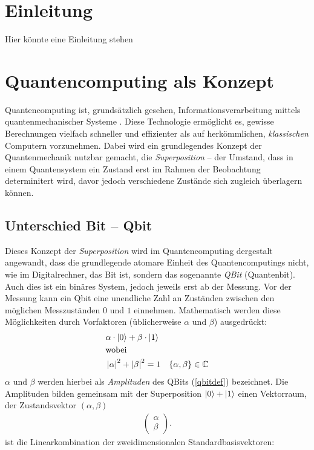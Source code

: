 \renewcommand*{\arraystretch}{1.0} %

\chapter{Einleitung}
Hier könnte eine Einleitung stehen

\chapter{Quantencomputing als Konzept}
Quantencomputing ist, grundsätzlich gesehen, Informationsverarbeitung mittels quantenmechanischer Systeme \cite[1]{NielsenChuang}.
Diese Technologie ermöglicht es, gewisse Berechnungen vielfach schneller und effizienter als auf herkömmlichen, \textit{klassischen} Computern vorzunehmen. Dabei wird ein grundlegendes Konzept der Quantenmechanik nutzbar gemacht, die \textit{Superposition} -- der Umstand, dass in einem Quantensystem ein Zustand erst im Rahmen der Beobachtung determinitert wird, davor jedoch verschiedene Zustände sich zugleich überlagern können. 


\section{Unterschied Bit -- Qbit}
Dieses Konzept der \textit{Superposition} wird im Quantencomputing dergestalt angewandt, dass die grundlegende atomare Einheit des Quantencomputings nicht, wie im Digitalrechner, das Bit ist, sondern das sogenannte \textit{QBit} (Quantenbit).
Auch dies ist ein binäres System, jedoch jeweils erst ab der Messung.
Vor der Messung kann ein Qbit eine unendliche Zahl an Zuständen zwischen den möglichen Messzuständen $0$ und $1$ einnehmen.
Mathematisch werden diese \glqq Möglichkeiten\grqq{} durch Vorfaktoren (üblicherweise $\alpha$ und $\beta$) ausgedrückt:
\begin{align}
&\alpha \cdot \ket{0}+\beta \cdot \ket{1} \label{qbitdef} \\
&\text{wobei}\notag \\ 
&\left\lvert \alpha \right\rvert ^2 + \left\lvert \beta \right\rvert ^2 = 1 & \{ \alpha, \beta \} \in \mathbb{C}
\end{align}
$\alpha$ und $\beta$ werden hierbei als \textit{Amplituden} des QBits (\ref{qbitdef}) bezeichnet.
Die Amplituden bilden gemeinsam mit der Superposition $\ket{0}+\ket{1}$ einen Vektorraum, der Zustandsvektor $(\alpha, \beta)$
\begin{align}
    \begin{pmatrix}
        \alpha\\
        \beta
    \end{pmatrix}.
\end{align}
ist die Linearkombination der zweidimensionalen Standardbasisvektoren\cite[22]{Homeister}:

